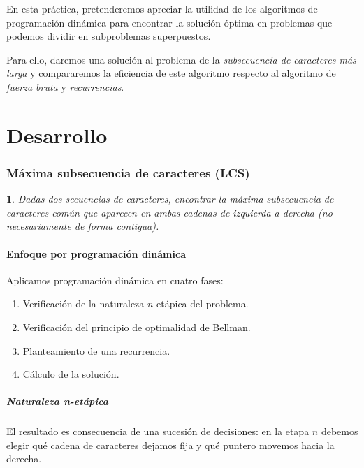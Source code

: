 \documentclass[10pt, a4paper]{article}
\theoremstyle{theorem-style}
\newtheorem*{datos}{}
\theoremstyle{theorem-style}
\theoremstyle{definition-style}
\theoremstyle{remark-style}
\theoremstyle{example-style}
\theoremstyle{definition-style}
\theoremstyle{remark-style}
\begin{document}
En esta práctica, pretenderemos apreciar la utilidad de los algoritmos de programación dinámica para encontrar la solución óptima en problemas que podemos dividir en subproblemas superpuestos.

Para ello, daremos una solución al problema de la \emph{subsecuencia de caracteres más larga} y compararemos la eficiencia de este algoritmo respecto al algoritmo de \emph{fuerza bruta} y \emph{recurrencias}.

\pagebreak
\part{Desarrollo}

\section{Máxima subsecuencia de caracteres (LCS)}

\begin{datos}
	{\sffamily Dadas dos secuencias de caracteres, encontrar la máxima subsecuencia de caracteres común que aparecen en ambas cadenas de izquierda a derecha (no necesariamente de forma contigua).}
\end{datos}


\subsection{Enfoque por programación dinámica}

Aplicamos programación dinámica en cuatro fases:

\begin{enumerate}
	\item Verificación de la naturaleza $n$-etápica del problema.
	\item Verificación del principio de optimalidad de Bellman.
	\item Planteamiento de una recurrencia. 
	\item Cálculo de la solución.
\end{enumerate}


\subsubsection{Naturaleza n-etápica}

El resultado es consecuencia de una sucesión de decisiones: en la etapa $n$ debemos elegir qué cadena de caracteres dejamos fija y qué puntero movemos hacia la derecha. 
\end{document}
